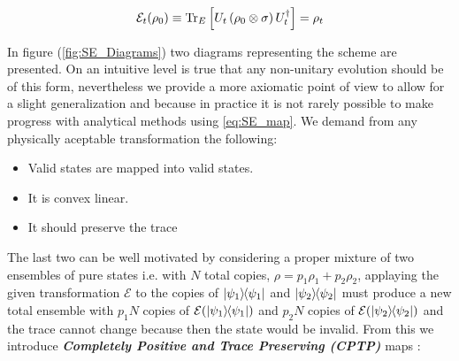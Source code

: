 \begin{equation} \label{eq:SE_map}
 \mathcal{E}_{t}(\rho_{0}) \equiv \mathrm{Tr}_{E}\left[U_{t}\left(\rho_{0}\otimes \sigma\right)U_{t}^{\dagger}\right] = \rho_{t}
\end{equation}

In figure (\ref{fig:SE_Diagrams}) two diagrams representing  the scheme are presented. On an intuitive level is true that any non-unitary
evolution should be of this form, nevertheless we provide a more axiomatic point of view to allow for a slight generalization and because in
practice it is not rarely possible to make progress with analytical methods using \eqref{eq:SE_map}. We demand from any physically aceptable
transformation the following:

\begin{itemize}
  \item Valid states are mapped into valid states.
  \item It is convex linear.
  \item  It should preserve the trace
\end{itemize}
The last two can be well motivated by considering a proper mixture of two ensembles of pure states i.e. with $N$ total copies, $\rho =
p_{1}\rho_{1} + p_{2}\rho_{2}$, applaying the given transformation $\mathcal{E}$ to the copies of  $\ketbra{\psi_{1}}$ and $\ketbra{\psi_{2}}$  must produce a new total ensemble with $p_{1}N$ copies of $\mathcal{E}(\ketbra{\psi_{1}})$ and $p_{2}N$ copies of
$\mathcal{E}(\ketbra{\psi_{2}})$ and the trace cannot change because then the state would be invalid. From this we introduce
\textit{\textbf{Completely Positive and Trace Preserving (CPTP)}} maps \cite{nielsen_quantum_2010}:

